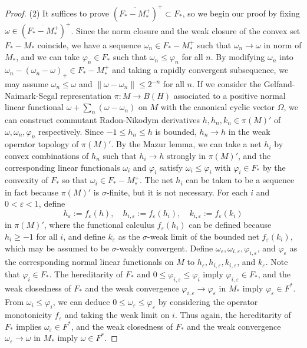 \documentclass[a4paper]{amsart}
\newcommand{\e}{\varepsilon}
\theoremstyle{plain}
\theoremstyle{definition}
\begin{document}
\begin{proof}
(2)
It suffices to prove $(\overline{F_*-M_*^+})^+\subset F_*$, so we begin our proof by fixing $\omega\in(\overline{F_*-M_*^+})^+$.
Since the norm closure and the weak closure of the convex set $F_*-M_*$ coincide, we have a sequence $\omega_n\in F_*-M_*^+$ such that $\omega_n\to\omega$ in norm of $M_*$, and we can take $\varphi_n\in F_*$ such that $\omega_n\le\varphi_n$ for all $n$.
By modifying $\omega_n$ into $\omega_n-(\omega_n-\omega)_+\in F_*-M_*^+$ and taking a rapidly convergent subsequence, we may assume $\omega_n\le\omega$ and $\|\omega-\omega_n\|\le2^{-n}$ for all $n$.
If we consider the Gelfand-Naimark-Segal representation $\pi:M\to B(H)$ associated to a positive normal linear functional $\omega+\sum_n(\omega-\omega_n)$ on $M$ with the canonical cyclic vector $\Omega$, we can construct commutant Radon-Nikodym derivatives $h,h_n,k_n\in\pi(M)'$ of $\omega,\omega_n,\varphi_n$ respectively.
Since $-1\le h_n\le h$ is bounded, $h_n\to h$ in the weak operator topology of $\pi(M)'$.
By the Mazur lemma, we can take a net $h_i$ by convex combinations of $h_n$ such that $h_i\to h$ strongly in $\pi(M)'$, and the corresponding linear functionals $\omega_i$ and $\varphi_i$ satisfy $\omega_i\le\varphi_i$ with $\varphi_i\in F_*$ by the convexity of $F_*$ so that $\omega_i\in F_*-M_*^+$.
The net $h_i$ can be taken to be a sequence in fact because $\pi(M)'$ is $\sigma$-finite, but it is not necessary.
For each $i$ and $0<\e<1$, define
\[h_\e:=f_\e(h),\quad h_{i,\e}:=f_\e(h_i),\quad k_{i,\e}:=f_\e(k_i)\]
in $\pi(M)'$, where the functional calculus $f_\e(h_i)$ can be defined because $h_i\ge-1$ for all $i$, and define $k_\e$ as the $\sigma$-weak limit of the bounded net $f_\e(k_i)$, which may be assumed to be $\sigma$-weakly convergent.
Define $\omega_\e,\omega_{i,\e},\varphi_{i,\e}$, and $\varphi_\e$ as the corresponding normal linear functionals on $M$ to $h_\e,h_{i,\e},k_{i,\e}$, and $k_\e$.
Note that $\varphi_i\in F_*$.
The hereditarity of $F_*$ and $0\le\varphi_{i,\e}\le\varphi_i$ imply $\varphi_{i,\e}\in F_*$, and the weak closedness of $F_*$ and the weak convergence $\varphi_{i,\e}\to\varphi_\e$ in $M_*$ imply $\varphi_\e\in F^*$.
From $\omega_i\le\varphi_i$, we can deduce $0\le\omega_\e\le\varphi_\e$ by considering the operator monotonicity $f_\e$ and taking the weak limit on $i$.
Thus again, the hereditarity of $F_*$ implies $\omega_\e\in F^*$, and the weak closedness of $F_*$ and the weak convergence $\omega_\e\to\omega$ in $M_*$ imply $\omega\in F^*$.
\end{proof}
\end{document}
